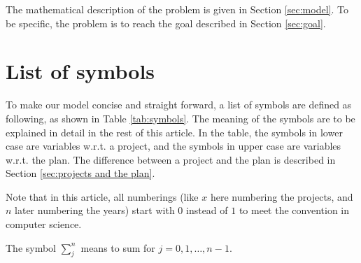 \documentclass{article}
\begin{document}

The mathematical description of the problem is given in Section \ref{sec:model}.
To be specific, the problem is to reach the goal described in Section \ref{sec:goal}.

\section{List of symbols}

To make our model concise and straight forward, a list of symbols are defined as following, as shown in Table \ref{tab:symbols}.
The meaning of the symbols are to be explained in detail in the rest of this article.
In the table, the symbols in lower case are variables w.r.t. a project,
and the symbols in upper case are variables w.r.t. the plan.
The difference between a project and the plan is described in Section \ref{sec:projects and the plan}.

Note that in this article, all numberings
(like $x$ here numbering the projects, and $n$ later numbering the years)
start with $0$ instead of $1$ to meet the convention in computer science.

The symbol $\sum_j^n$ means to sum for $j=0,1,\dots,n-1$.
\end{document}
